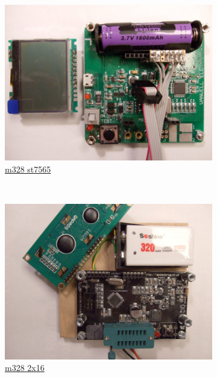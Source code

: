\documentclass[pdftex,12pt,a4paper,english]{article}
\begin{document}
\begin{figure}[H]
  \begin{subfigure}[b]{.3\textwidth}
    \centering
    \includegraphics[width=1.\textwidth]{../PNG/m328_van_st7565.JPG}
	  \\ \vspace{-0.5em}
	  {\href{run:./trunk/mega328_wei_st7565/.}{m328 st7565}}
  \end{subfigure}
~
  \begin{subfigure}[b]{.3\textwidth}
    \centering
    \includegraphics[width=1.\textwidth]{../PNG/m328_2x16.JPG}
	  \\ \vspace{-0.5em}
	  {\href{run:./trunk/mega328_2X16_menu/.}{m328 2x16}} \hspace{10pt}

\end{subfigure}
\end{figure}
\end{document}
